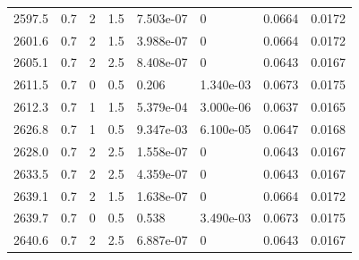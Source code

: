 \documentclass[preview]{standalone}
\begin{document}
{{{{{{{\begin{tabular}{L{1.2cm}C{1.2cm} C{0.3cm}C{0.5cm} C{1.4cm}C{1.4cm} C{1.4cm}C{1.4cm}}
  2597.5  &   0.7  & 2     & 1.5 &  7.503e-07  & 0  & 0.0664 &  0.0172   \\ 
  2601.6  &   0.7  & 2     & 1.5 &  3.988e-07  & 0  & 0.0664 &  0.0172   \\ 
  2605.1  &   0.7  & 2     & 2.5 &  8.408e-07  & 0  & 0.0643 &  0.0167   \\ 
  2611.5  &   0.7  & 0     & 0.5 &  0.206  & 1.340e-03  & 0.0673 &  0.0175   \\ 
  2612.3  &   0.7  & 1     & 1.5 &  5.379e-04  & 3.000e-06  & 0.0637 &  0.0165   \\ 
  2626.8  &   0.7  & 1     & 0.5 &  9.347e-03  & 6.100e-05  & 0.0647 &  0.0168   \\ 
  2628.0  &   0.7  & 2     & 2.5 &  1.558e-07  & 0  & 0.0643 &  0.0167   \\ 
  2633.5  &   0.7  & 2     & 2.5 &  4.359e-07  & 0  & 0.0643 &  0.0167   \\ 
  2639.1  &   0.7  & 2     & 1.5 &  1.638e-07  & 0  & 0.0664 &  0.0172   \\ 
  2639.7  &   0.7  & 0     & 0.5 &  0.538  & 3.490e-03  & 0.0673 &  0.0175   \\ 
  2640.6  &   0.7  & 2     & 2.5 &  6.887e-07  & 0  & 0.0643 &  0.0167   \\ 
\hline 
\end{tabular} 

}}}}}}}
\end{document}
